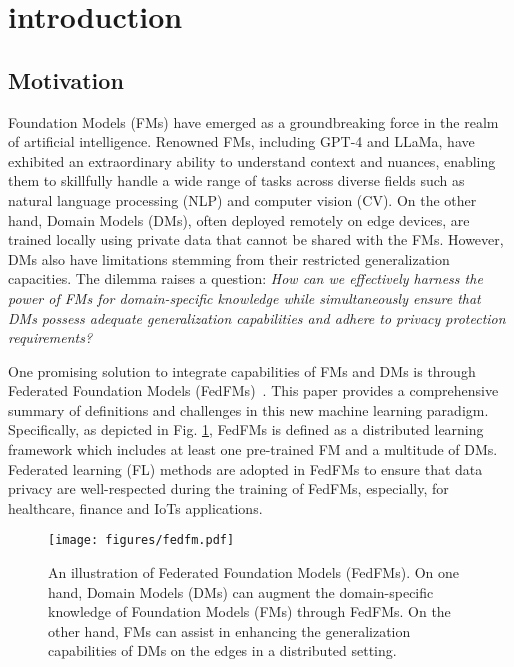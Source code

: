 
\section{introduction}

\subsection{Motivation}

Foundation Models (FMs) \cite{zhou2024comprehensive} have emerged as a groundbreaking force in the realm of artificial intelligence. Renowned FMs, including GPT-4 and LLaMa, have exhibited an extraordinary ability to understand context and nuances, enabling them to skillfully handle a wide range of tasks across diverse fields such as natural language processing (NLP) and computer vision (CV).
On the other hand, Domain Models (DMs), often deployed  remotely on edge devices, are trained locally using private data that cannot be shared with the FMs. However, DMs also have limitations stemming from their restricted generalization capacities.
The dilemma  raises a question: \textit{How can we effectively harness the power of FMs for domain-specific knowledge while simultaneously ensure that DMs possess adequate generalization capabilities and adhere to privacy protection requirements?}



One promising solution to integrate capabilities of FMs and DMs is through Federated Foundation Models (FedFMs)~\cite{fan2023fate,kang2023grounding,ren2024advances}.  This paper provides a comprehensive summary of definitions and challenges in this new machine learning paradigm. Specifically, as depicted in Fig. \ref{fig:fedfms}, FedFMs is defined as a distributed learning framework which includes at least one pre-trained FM and a multitude of DMs. 
Federated learning (FL) \cite{yang2019federated} methods are adopted in FedFMs to ensure that data privacy are well-respected during the training of FedFMs, especially, for healthcare, finance and IoTs  applications.

\captionsetup[table]{labelformat=simple, labelsep=newline, textfont=sc, justification=centering}


\begin{figure}
    \centering
    \texttt{[image: figures/fedfm.pdf]}
    \caption{An illustration of Federated Foundation Models (FedFMs). 
    On one hand, Domain Models (DMs) can augment the domain-specific knowledge of Foundation Models (FMs) through FedFMs. On the other hand, FMs can assist in enhancing the generalization capabilities of DMs on the edges in a distributed setting.}
    \label{fig:fedfms}
    \vspace{-5mm}
\end{figure}


